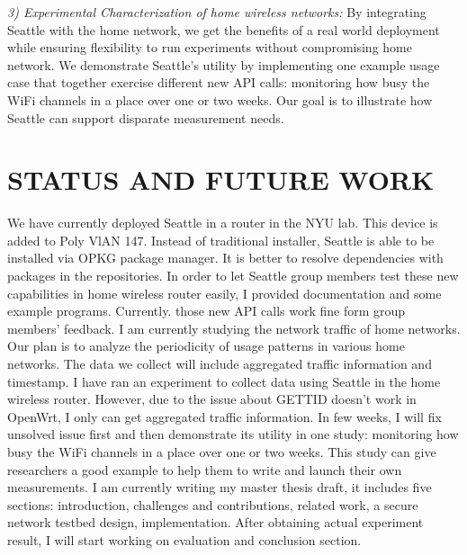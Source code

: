 \documentclass[conference]{IEEEtran}   	%
\begin{document}
\textit{3) Experimental Characterization of home wireless networks: } By integrating Seattle with the home network, we get the benefits of a real world deployment while ensuring flexibility to run experiments without compromising home network. We demonstrate Seattle's utility by implementing one example usage case that together exercise different new API calls: monitoring how busy the WiFi channels in a place over one or two weeks. Our goal is to illustrate how Seattle can support disparate measurement needs.

\section{STATUS AND FUTURE WORK}
We have currently deployed Seattle in a router in the NYU lab. This device is added to Poly VlAN 147. Instead of traditional installer, Seattle is able to be installed via OPKG package manager\cite{opkg}\cite{seattle-openwrt}. It is better to resolve dependencies with packages in the repositories. In order to let Seattle group members test these new capabilities in home wireless router easily, I provided documentation and some example programs\cite{test}. Currently. those new API calls work fine form group members' feedback. I am currently studying the network traffic of home networks. Our plan is to analyze the periodicity of usage patterns in various home networks. The data we collect will include aggregated traffic information and timestamp. I have ran an experiment to collect data using Seattle in the home wireless router. However, due to the issue\cite{gettid_issue} about GETTID doesn't work in OpenWrt, I only can get aggregated traffic information.
\newline
In few weeks, I will fix unsolved issue first and then demonstrate its utility in one study: monitoring how busy the WiFi channels in a place over one or two weeks. This study can give researchers a good example to help them to write and launch their own measurements. I am currently writing my master thesis draft, it includes five sections: introduction, challenges and contributions, related work, a secure network testbed design, implementation. After obtaining actual experiment result, I will start working on evaluation and conclusion section.



\end{document}
